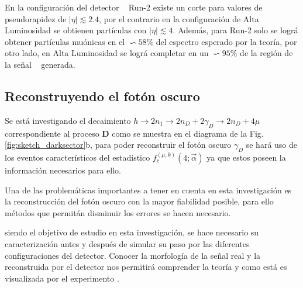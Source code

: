 En la configuración del detector \CMS ~ Run-2 existe un corte para valores de pseudorapidez de $|\eta|\lesssim 2.4$, por el contrario en la configuración de Alta Luminosidad se obtienen partículas con $|\eta|\lesssim 4$. Además, para Run-2 solo se lográ obtener partículas muónicas en el $\backsim 58\%$ del espectro esperado por la teoría, por otro lado, en Alta Luminosidad se lográ completar en un $\backsim 95\%$ de la región de la señal \MC ~ generada.


\subsection{Reconstruyendo el fotón oscuro}
Se está investigando el decaimiento $h \rightarrow 2n_1 \rightarrow 2n_D + 2\gamma_D \rightarrow 2n_D + 4\mu$ correspondiente al proceso \MSSM\textbf{D} como se muestra en el diagrama de la Fig. \ref{fig:sketch_darksector}b, para poder reconstruir el fotón oscuro $\gamma_D$ se hará uso de los eventos característicos del estadístico $f^{(\mu, k)}_\textsf{e} (4;\vec{\alpha})$ ya que estos poseen la información necesarios para ello.

Una de las problemáticas importantes a tener en cuenta en esta investigación es la reconstrucción del fotón oscuro con la mayor fiabilidad posible, para ello métodos que permitán disminuir los errores se hacen necesario. 

siendo el objetivo de estudio en esta investigación, se hace necesario su caracterización antes y después de simular su paso por las diferentes configuraciones del detector. Conocer la morfología de la señal real y la reconstruida por el detector nos permitirá comprender la teoría y como está es visualizada por el experimento \CMS.






















